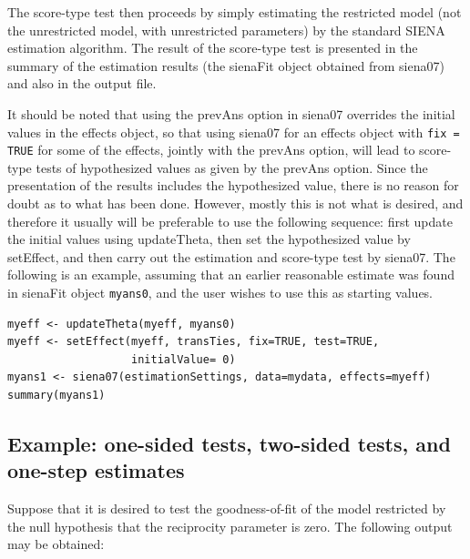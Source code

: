 \documentclass[a4paper,fleqn,11pt]{article}
\newcommand{\+}{\, + \,}
\newcommand{\sfn}[1]{\textsf{#1}}
\newcommand{\SI}{{\sf SIENA }}
\begin{document}
The score-type test then
proceeds by simply estimating the restricted model (not the unrestricted model,
with unrestricted parameters) by the standard \SI estimation algorithm.
The result of the score-type test is presented in the \sfn{summary}
of the estimation results (the \sfn{sienaFit} object obtained from
\sfn{siena07}) and also in the output file.

It should be noted that using the \sfn{prevAns} option in \sfn{siena07}
overrides the initial values in the effects object,
so that using \sfn{siena07} for an effects object with
\texttt{fix = TRUE} for some of the effects, jointly with
the \sfn{prevAns} option, will lead to score-type tests
of hypothesized values as given by the  \sfn{prevAns} option.
Since the presentation of the results includes the
hypothesized value, there is no reason for doubt as to what
has been done. However, mostly this is not what is desired,
and therefore it usually will be preferable to use the following sequence:
first update the initial values using \sfn{updateTheta}, then
set the hypothesized value by \sfn{setEffect}, and then
carry out the estimation and score-type test by \sfn{siena07}.
The following is an example, assuming that an earlier
reasonable estimate was found in \sfn{sienaFit} object \texttt{myans0},
and the user wishes to use this as starting values.
\begin{verbatim}
myeff <- updateTheta(myeff, myans0)
myeff <- setEffect(myeff, transTies, fix=TRUE, test=TRUE,
                   initialValue= 0)
myans1 <- siena07(estimationSettings, data=mydata, effects=myeff)
summary(myans1)
\end{verbatim}

\subsection{Example: one-sided tests, two-sided tests, and one-step estimates}
\label{example}

Suppose that it is desired to test the goodness-of-fit of the model
restricted by the null hypothesis that the reciprocity parameter is zero.
The following output may be obtained:
\end{document}

